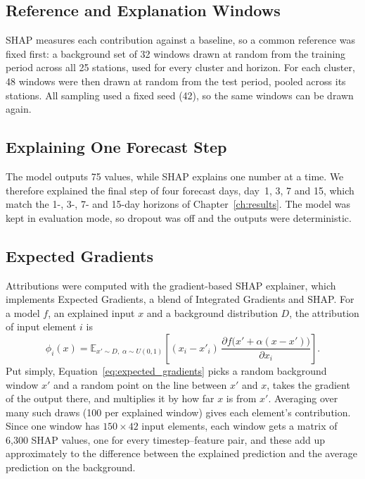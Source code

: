 \subsection{Reference and Explanation Windows}
\label{sec:3.17.2}

SHAP measures each contribution against a baseline, so a common reference was
fixed first: a background set of 32 windows drawn at random from the training
period across all 25 stations, used for every cluster and horizon. For each
cluster, 48 windows were then drawn at random from the test period, pooled
across its stations. All sampling used a fixed seed (42), so the same windows
can be drawn again.

\subsection{Explaining One Forecast Step}
\label{sec:3.17.3}

The model outputs 75 values, while SHAP explains one number at a time. We
therefore explained the final step of four forecast days, day~1, 3, 7 and 15,
which match the 1-, 3-, 7- and 15-day horizons of Chapter~\ref{ch:results}. The
model was kept in evaluation mode, so dropout was off and the outputs were
deterministic.

\subsection{Expected Gradients}
\label{sec:3.17.4}

Attributions were computed with the gradient-based SHAP explainer, which
implements Expected Gradients, a blend of Integrated Gradients and SHAP. For a
model $f$, an explained input $x$ and a background distribution $D$, the
attribution of input element $i$ is
\begin{equation}
\phi_i(x) = \mathbb{E}_{x' \sim D,\; \alpha \sim U(0,1)}
\left[ (x_i - x'_i)\,
\frac{\partial f\bigl(x' + \alpha (x - x')\bigr)}{\partial x_i} \right].
\label{eq:expected_gradients}
\end{equation}
Put simply, Equation~\eqref{eq:expected_gradients} picks a random background
window $x'$ and a random point on the line between $x'$ and $x$, takes the
gradient of the output there, and multiplies it by how far $x$ is from $x'$.
Averaging over many such draws (100 per explained window) gives each element's
contribution. Since one window has $150 \times 42$ input elements, each window
gets a matrix of 6{,}300 SHAP values, one for every timestep--feature pair, and
these add up approximately to the difference between the explained prediction
and the average prediction on the background.

